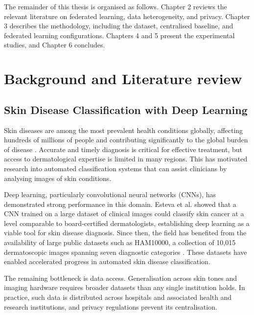 \documentclass[12pt,openany,a4paper]{book}
\begin{document}
  The remainder of this thesis is organised as follows. Chapter 2 reviews the relevant literature on federated learning, data heterogeneity, and privacy. Chapter 3 describes the methodology, including the dataset, centralised baseline, and federated learning configurations. Chapters 4 and 5 present the experimental studies, and Chapter 6 concludes.


\chapter{Background and Literature review}

\section{Skin Disease Classification with Deep Learning}
Skin diseases are among the most prevalent health conditions globally, affecting hundreds of millions of people and contributing significantly to the global burden of disease \cite{hayGlobalBurdenSkin2014}. Accurate and timely diagnosis is critical for effective treatment, but access to dermatological expertise is limited in many regions. This has motivated research into automated classification systems that can assist clinicians by analysing images of skin conditions.

Deep learning, particularly convolutional neural networks (CNNs), has demonstrated strong performance in this domain. Esteva et al. \cite{estevaDermatologistlevelClassificationSkin2017} showed that a CNN trained on a large dataset of clinical images could classify skin cancer at a level comparable to board-certified dermatologists, establishing deep learning as a viable tool for skin disease diagnosis. Since then, the field has benefited from the availability of large public datasets such as HAM10000, a collection of 10,015 dermatoscopic images spanning seven diagnostic categories \cite{tschandlHAM10000DatasetLarge2018}. These datasets have enabled accelerated progress in automated skin disease classification.

The remaining bottleneck is data access. Generalisation across skin tones and imaging hardware requires broader datasets than any single institution holds. In practice, such data is distributed across hospitals and associated health and research institutions, and privacy regulations prevent its centralisation.
\end{document}

